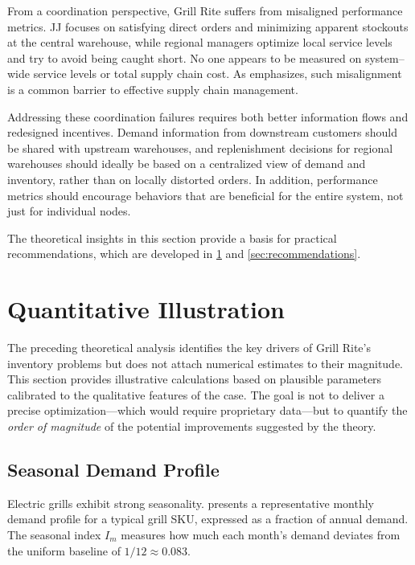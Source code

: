 \documentclass[12pt,a4paper]{article}
\begin{document}
From a coordination perspective, Grill Rite suffers from misaligned performance metrics. JJ focuses on satisfying direct orders and minimizing apparent stockouts at the central warehouse, while regional managers optimize local service levels and try to avoid being caught short. No one appears to be measured on system–wide service levels or total supply chain cost. As \citet{stevenson2017operations} emphasizes, such misalignment is a common barrier to effective supply chain management.

Addressing these coordination failures requires both better information flows and redesigned incentives. Demand information from downstream customers should be shared with upstream warehouses, and replenishment decisions for regional warehouses should ideally be based on a centralized view of demand and inventory, rather than on locally distorted orders. In addition, performance metrics should encourage behaviors that are beneficial for the entire system, not just for individual nodes.

The theoretical insights in this section provide a basis for practical recommendations, which are developed in \cref{sec:quantitative} and \cref{sec:recommendations}.

\section{Quantitative Illustration}
\label{sec:quantitative}

The preceding theoretical analysis identifies the key drivers of Grill Rite's inventory problems but does not attach numerical estimates to their magnitude. This section provides illustrative calculations based on plausible parameters calibrated to the qualitative features of the case. The goal is not to deliver a precise optimization---which would require proprietary data---but to quantify the \emph{order of magnitude} of the potential improvements suggested by the theory.

\subsection{Seasonal Demand Profile}

Electric grills exhibit strong seasonality.  presents a representative monthly demand profile for a typical grill SKU, expressed as a fraction of annual demand. The seasonal index $I_m$ measures how much each month's demand deviates from the uniform baseline of $1/12 \approx 0.083$.
\end{document}
